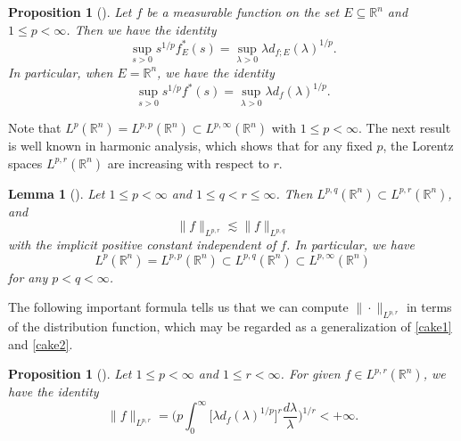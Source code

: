 \documentclass{birkjour}
\newtheorem{lem}[thm]{Lemma}
\newtheorem{prop}[thm]{Proposition}
\theoremstyle{definition}
\theoremstyle{remark}
\numberwithin{equation}{section}
\begin{document}
\begin{prop}[\cite{Grafakos2,sw}]\label{prop21}
Let $f$ be a measurable function on the set $E\subseteq\mathbb R^n$ and $1\leq p<\infty$. Then we have the identity
\begin{equation*}
\sup_{s>0}s^{1/p}f^{*}_{E}(s)=\sup_{\lambda>0}\lambda d_{f;E}(\lambda)^{1/p}.
\end{equation*}
In particular, when $E=\mathbb R^n$, we have the identity
\begin{equation*}
\sup_{s>0}s^{1/p}f^{*}(s)=\sup_{\lambda>0}\lambda d_{f}(\lambda)^{1/p}.
\end{equation*}
\end{prop}
Note that $L^{p}(\mathbb R^n)=L^{p,p}(\mathbb R^n)\subset L^{p,\infty}(\mathbb R^n)$ with $1\leq p<\infty$. The next result is well known in harmonic analysis, which shows that for any fixed $p$, the Lorentz spaces $L^{p,r}(\mathbb R^n)$ are increasing with respect to $r$.
\begin{lem}[\cite{Grafakos2,sw}]\label{prop22}
Let $1\leq p<\infty$ and $1\leq q<r\leq\infty$. Then $L^{p,q}(\mathbb R^n)\subset L^{p,r}(\mathbb R^n)$, and
\begin{equation*}
\|f\|_{L^{p,r}}\lesssim\|f\|_{L^{p,q}}
\end{equation*}
with the implicit positive constant independent of $f$. In particular, we have
\begin{equation*}
L^{p}(\mathbb R^n)=L^{p,p}(\mathbb R^n)\subset L^{p,q}(\mathbb R^n)\subset L^{p,\infty}(\mathbb R^n)
\end{equation*}
for any $p<q<\infty$.
\end{lem}

The following important formula tells us that we can compute $\|\cdot\|_{L^{p,r}}$ in terms of the distribution function, which may be regarded as a generalization of \eqref{cake1} and \eqref{cake2}.
\begin{prop}[\cite{Grafakos2,sw}]\label{prop23}
Let $1\leq p<\infty$ and $1\leq r<\infty$. For given $f\in L^{p,r}(\mathbb R^n)$, we have the identity
\begin{equation*}
\|f\|_{L^{p,r}}=\bigg(p\int_0^{\infty}\Big[\lambda d_f(\lambda)^{1/p}\Big]^r\frac{d\lambda}{\lambda}\bigg)^{1/r}<+\infty.
\end{equation*}
\end{prop}
\end{document}
